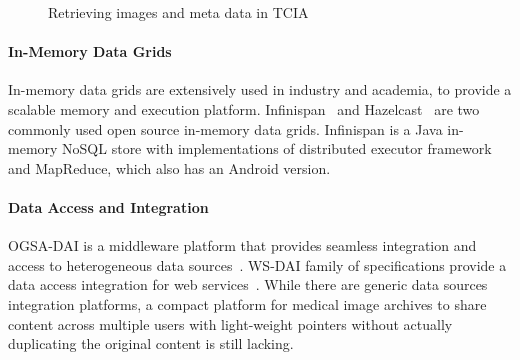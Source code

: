 \documentclass[letterpaper, 10 pt, conference]{ieeeconf}  %
\begin{document}
\begin{figure}[!h]
	\begin{center}
		\vspace{-10pt}
		
	\end{center}
	\caption{Retrieving images and meta data in TCIA}
	\label{fig:methods}
	\vspace{-15pt}
\end{figure}


\paragraph*{\textbf{In-Memory Data Grids}}
In-memory data grids are extensively used in industry and academia, to provide a scalable memory and execution platform. Infinispan~\cite{marchioni2012infinispan} and Hazelcast~\cite{hazelcast} are two commonly used open source in-memory data grids. Infinispan is a Java in-memory NoSQL store with implementations of distributed executor framework and MapReduce, which also has an Android version. 

\paragraph*{\textbf{Data Access and Integration}}
OGSA-DAI is a middleware platform that provides seamless integration and access to heterogeneous data sources~\cite{antonioletti2005design}. WS-DAI family of specifications provide a data access integration for web services~\cite{antonioletti2006ws}. While there are generic data sources integration platforms, a compact platform for medical image archives to share content across multiple users with light-weight pointers without actually duplicating the original content is still lacking.
\end{document}
